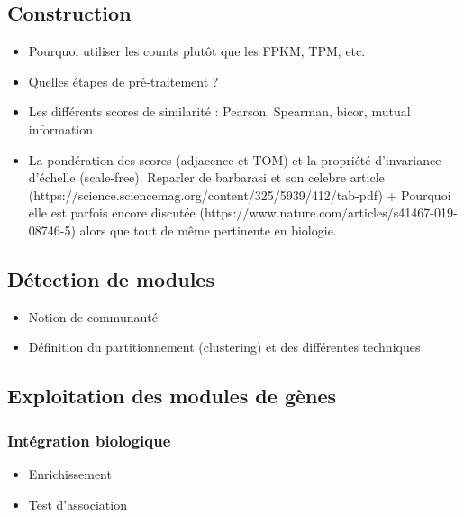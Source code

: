 \subsection{Construction}
\begin{itemize}
\item Pourquoi utiliser les counts plutôt que les FPKM, TPM, etc.
\item Quelles étapes de pré-traitement ?
\item Les différents scores de similarité : Pearson, Spearman, bicor, mutual information
\item La pondération des scores (adjacence et TOM) et la propriété d'invariance d'échelle (scale-free). Reparler de barbarasi et son celebre article (https://science.sciencemag.org/content/325/5939/412/tab-pdf) + Pourquoi elle est parfois encore discutée (https://www.nature.com/articles/s41467-019-08746-5) alors que tout de même pertinente en biologie. 
\end{itemize}
\subsection{Détection de modules}
\begin{itemize}
    \item Notion de communauté
    \item Définition du partitionnement (clustering) et des différentes techniques
\end{itemize}

\subsection{Exploitation des modules de gènes}

\subsubsection{Intégration biologique}
\begin{itemize}
    \item Enrichissement
    \item Test d'association
\end{itemize}

